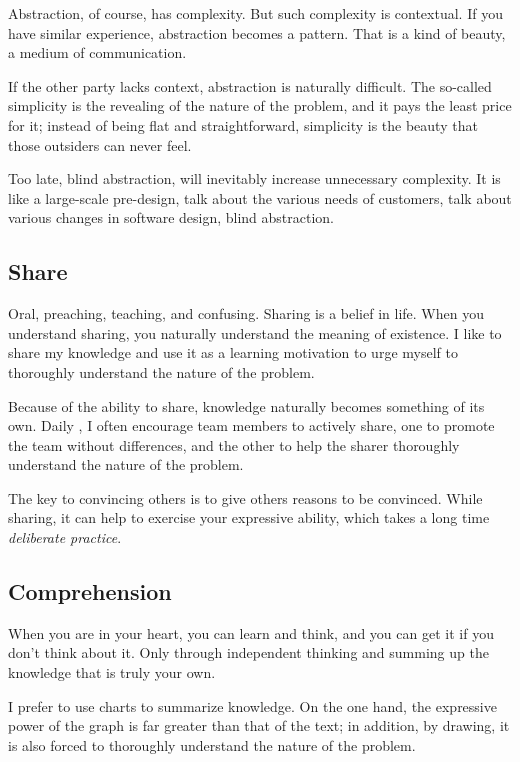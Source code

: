 \begin{content}
Abstraction, of course, has complexity. But such complexity is contextual. If you have similar experience, abstraction becomes a pattern. That is a kind of beauty, a medium of communication.

If the other party lacks context, abstraction is naturally difficult. The so-called simplicity is the revealing of the nature of the problem, and it pays the least price for it; instead of being flat and straightforward, simplicity is the beauty that those outsiders can never feel.

Too late, blind abstraction, will inevitably increase unnecessary complexity. It is like a large-scale pre-design, talk about the various needs of customers, talk about various changes in software design, blind abstraction.


\subsection{Share}
Oral, preaching, teaching, and confusing. Sharing is a belief in life. When you understand sharing, you naturally understand the meaning of existence. I like to share my knowledge and use it as a learning motivation to urge myself to thoroughly understand the nature of the problem.

Because of the ability to share, knowledge naturally becomes something of its own. Daily , I often encourage team members to actively share, one to promote the team without differences, and the other to help the sharer thoroughly understand the nature of the problem.

The key to convincing others is to give others reasons to be convinced. While sharing, it can help to exercise your expressive ability, which takes a long time \emph{deliberate practice}.


\subsection{Comprehension}
When you are in your heart, you can learn and think, and you can get it if you don’t think about it. Only through independent thinking and summing up the knowledge that is truly your own.

I prefer to use charts to summarize knowledge. On the one hand, the expressive power of the graph is far greater than that of the text; in addition, by drawing, it is also forced to thoroughly understand the nature of the problem.

\end{content}


